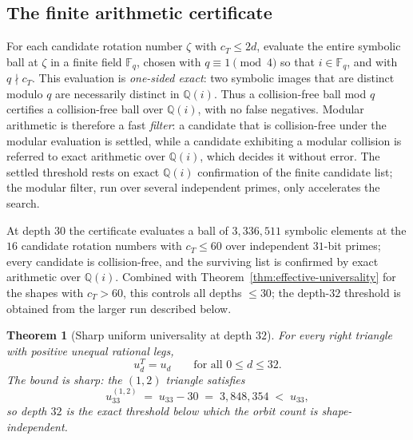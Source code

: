 \documentclass[11pt]{article}
\theoremstyle{plain}
\newtheorem{theorem}{Theorem}
\theoremstyle{definition}
\theoremstyle{remark}
\begin{document}
\subsection{The finite arithmetic certificate}

For each candidate rotation number $\zeta$ with $c_T \le 2d$, evaluate
the entire symbolic ball at $\zeta$ in a finite field $\mathbb{F}_q$,
chosen with $q \equiv 1 \pmod 4$ so that $i \in \mathbb{F}_q$, and with
$q \nmid c_T$. This evaluation is \emph{one-sided exact}: two symbolic
images that are distinct modulo $q$ are necessarily distinct in
$\mathbb{Q}(i)$. Thus a collision-free ball mod $q$ certifies a
collision-free ball over $\mathbb{Q}(i)$, with no false negatives.
Modular arithmetic is therefore a fast \emph{filter}: a candidate that
is collision-free under the modular evaluation is settled, while a
candidate exhibiting a modular collision is referred to exact
arithmetic over $\mathbb{Q}(i)$, which decides it without error. The
settled threshold rests on exact $\mathbb{Q}(i)$ confirmation of the
finite candidate list; the modular filter, run over several independent
primes, only accelerates the search.

At depth $30$ the certificate evaluates a ball of $3{,}336{,}511$
symbolic elements at the $16$ candidate rotation numbers with
$c_T \le 60$ over independent $31$-bit primes; every candidate is
collision-free, and the surviving list is confirmed by exact arithmetic
over $\mathbb{Q}(i)$. Combined with
Theorem~\ref{thm:effective-universality} for the shapes with
$c_T > 60$, this controls all depths $\le 30$; the depth-$32$ threshold
is obtained from the larger run described below.

\begin{theorem}[Sharp uniform universality at depth $32$]
\label{thm:universality-sharp}
For every right triangle with positive unequal rational legs,
\[
u_d^T = u_d \qquad \text{for all } 0 \le d \le 32 .
\]
The bound is \emph{sharp}: the $(1,2)$ triangle satisfies
\[
u_{33}^{(1,2)} \;=\; u_{33} - 30 \;=\; 3{,}848{,}354 \;<\; u_{33},
\]
so depth $32$ is the exact threshold below which the orbit count is
shape-independent.
\end{theorem}
\end{document}
